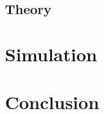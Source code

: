 \documentclass[12pt,letterpaper]{article}
\begin{document}
\subsection{Theory}


\section{Simulation}

\section{Conclusion}
\end{document}
